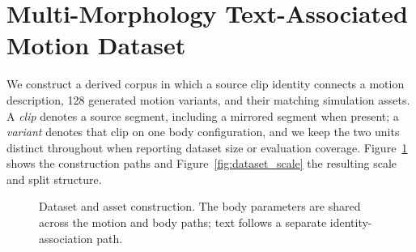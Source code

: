 \section{Multi-Morphology Text-Associated Motion Dataset}\label{sec:dataset}

We construct a derived corpus in which a source clip identity connects a motion
description, 128 generated motion variants, and their matching simulation
assets. A \emph{clip} denotes a source segment, including a mirrored segment
when present; a \emph{variant} denotes that clip on one body configuration,
and we keep the two units distinct throughout when reporting dataset size or
evaluation coverage. Figure~\ref{fig:data_pipeline} shows the construction
paths and Figure~\ref{fig:dataset_scale} the resulting scale and split
structure.

\begin{figure}[t]
\centering
{}
\caption{Dataset and asset construction. The body parameters are shared across
the motion and body paths; text follows a separate identity-association path.}\label{fig:data_pipeline}
\end{figure}

